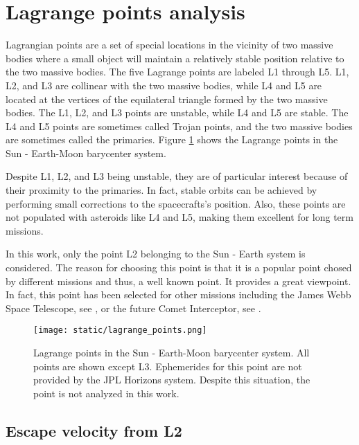 \section{Lagrange points analysis}

Lagrangian points are a set of special locations in the vicinity of two massive
bodies where a small object will maintain a relatively stable position relative
to the two massive bodies. The five Lagrange points are labeled L1 through L5.
L1, L2, and L3 are collinear with the two massive bodies, while L4 and L5 are
located at the vertices of the equilateral triangle formed by the two massive
bodies. The L1, L2, and L3 points are unstable, while L4 and L5 are stable. The
L4 and L5 points are sometimes called Trojan points, and the two massive bodies
are sometimes called the primaries. Figure \ref{fig:lagrange_points} shows the
Lagrange points in the Sun - Earth-Moon barycenter system.

Despite L1, L2, and L3 being unstable, they are of particular interest because
of their proximity to the primaries. In fact, stable orbits can be achieved
by performing small corrections to the spacecrafts's position. Also, these
points are not populated with asteroids like L4 and L5, making them excellent
for long term missions.

In this work, only the point L2 belonging to the Sun - Earth system is
considered. The reason for choosing this point is that it is a popular point
chosed by different missions and thus, a well known point. It provides a great
viewpoint. In fact, this point has been selected for other missions including
the James Webb Space Telescope, see \cite{gardner2006}, or the future Comet
Interceptor, see \cite{jones2019}.

\begin{figure}[H]
    \centering
    \texttt{[image: static/lagrange\_points.png]}
    \caption[Lagrange points in the Sun - Earth system.]{Lagrange points in the
        Sun - Earth-Moon barycenter system. All points are shown except L3. Ephemerides for this
        point are not provided by the JPL Horizons system. Despite this
        situation, the point is not analyzed in this work.}
    \label{fig:lagrange_points}
\end{figure}

\subsection{Escape velocity from L2}


